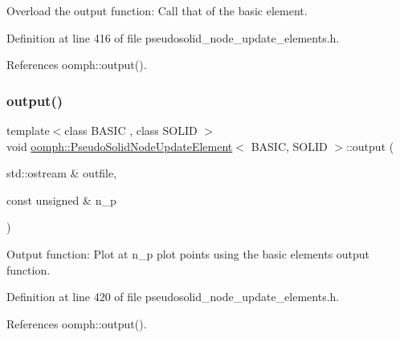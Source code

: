 Overload the output function\+: Call that of the basic element. 



Definition at line 416 of file pseudosolid\+\_\+node\+\_\+update\+\_\+elements.\+h.



References oomph\+::output().

\mbox{\label{classoomph_1_1PseudoSolidNodeUpdateElement_a293e9f73e7dd0429755379e17326994b}} 
\subsubsection{\texorpdfstring{output()}{output()}\hspace{0.1cm}{\footnotesize\ttfamily [2/4]}}
{\footnotesize\ttfamily template$<$class B\+A\+S\+IC , class S\+O\+L\+ID $>$ \\
void \hyperlink{classoomph_1_1PseudoSolidNodeUpdateElement}{oomph\+::\+Pseudo\+Solid\+Node\+Update\+Element}$<$ B\+A\+S\+IC, S\+O\+L\+ID $>$\+::output (\begin{DoxyParamCaption}\item[{std\+::ostream \&}]{outfile,  }\item[{const unsigned \&}]{n\+\_\+p }\end{DoxyParamCaption})\hspace{0.3cm}{\ttfamily [inline]}}



Output function\+: Plot at n\+\_\+p plot points using the basic element\textquotesingle{}s output function. 



Definition at line 420 of file pseudosolid\+\_\+node\+\_\+update\+\_\+elements.\+h.



References oomph\+::output().

\mbox{\label{classoomph_1_1PseudoSolidNodeUpdateElement_ade73359e3600d32d64cf8acced341776}} 
